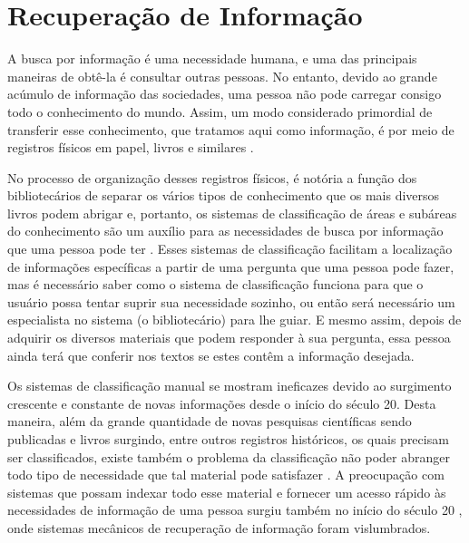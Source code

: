 \section{Recuperação de Informação} \label{sec:RecuperaçãoInformação}



    A busca por informação é uma necessidade humana, e uma das principais maneiras de obtê-la é consultar outras pessoas.
    No entanto, devido ao grande acúmulo de informação das sociedades, uma pessoa não pode carregar consigo todo o conhecimento do mundo.
    Assim, um modo considerado primordial de transferir esse conhecimento, que tratamos aqui como informação, é por meio de registros físicos em papel, livros e similares \cite[p.~1]{Grossman2004IRAH}.
    
    No processo de organização desses registros físicos, é notória a função dos bibliotecários de separar os vários tipos de conhecimento que os mais diversos livros podem abrigar e, portanto, os sistemas de classificação de áreas e subáreas do conhecimento são um auxílio para as necessidades de busca por informação que uma pessoa pode ter \cite[p.~1]{Manning2008IIR} \cite[p.~1446]{Sanderson2012THIRR} \cite[p.~6]{Baeza-Yates1999}. 
    Esses sistemas de classificação facilitam a localização de informações específicas a partir de uma pergunta que uma pessoa pode fazer, mas é necessário saber como o sistema de classificação funciona para que o usuário possa tentar suprir sua necessidade sozinho, ou então será necessário um especialista no sistema (o bibliotecário) para lhe guiar.
    E mesmo assim, depois de adquirir os diversos materiais que podem responder à sua pergunta, essa pessoa ainda terá que conferir nos textos se estes contêm a informação desejada.
    
    
    Os sistemas de classificação manual se mostram ineficazes devido ao surgimento crescente e constante de novas informações \cite[p.~6]{Baeza-Yates1999} desde o início do século 20. 
    Desta maneira, além da grande quantidade de novas pesquisas científicas sendo publicadas e livros surgindo, entre outros registros históricos, os quais precisam ser classificados, existe também o problema da classificação não poder abranger todo tipo de necessidade que tal material pode satisfazer \cite[p.~1444]{Sanderson2012THIRR}. 
    A preocupação com sistemas que possam indexar todo esse material e fornecer um acesso rápido às necessidades de informação de uma pessoa surgiu também no início do século 20 \cite{Bush:1979:WMT:1113634.1113638}, onde sistemas mecânicos de recuperação de informação foram vislumbrados.
    
